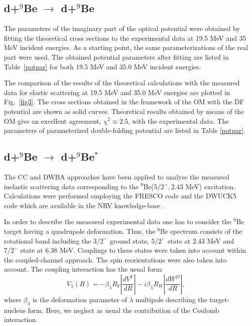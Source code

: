 \documentclass[
12pt, %
oneside, %
english, %
onehalfspacing, %
headsepline, %
]{MastersDoctoralThesis} %
\begin{document}
\subsection{d+$^9$Be $\rightarrow$ d+$^9$Be}
The parameters of the imaginary part of the optical potential were obtained by fitting the theoretical cross sections to the experimental data at 19.5 MeV and 35 MeV incident energies. As a starting point, the same parameterizations of the real part were used. The obtained potential parameters after fitting are listed in Table~\ref{potpar} for both 19.5 MeV and 35.0 MeV incident energies.

The comparison of the results of the theoretical calculations with  the measured data for elastic scattering at 19.5 MeV and 35.0 MeV energies are plotted in Fig.~\ref{fig3}. 
The cross sections obtained in the framework of the OM with the DF potential are shown as solid curves. 
Theoretical results obtained by means of the OM give an excellent agreement, $\chi^2\approx2.5$, with the experimental data. The  parameters of  parameterized double-folding potential are listed in Table \ref{potpar}. 

\subsection{d+$^9$Be $\rightarrow$ d+$^9$Be$^*$}

The CC and DWBA approaches have been applied to analyse the measured inelastic scattering data corresponding to the ${}^9$Be($5/2^-, 2.43$ MeV) excitation. Calculations were performed employing the FRESCO code \cite{fresco} and the DWUCK5 code \cite{kunz} which are available in the NRV knowledge-base \cite{nrv}.

In order to describe the measured experimental data one has to consider the ${}^9$Be target having a quadrupole deformation. Thus, the ${}^9$Be spectrum consists of the rotational band including the  $3/2^-$ ground state, $5/2^-$ state at 2.43 MeV and $7/2^-$ state at 6.38 MeV. Couplings to these states were taken into account within the coupled-channel approach. The spin reorientations were also taken into account. The coupling interaction has the usual form:
\begin{equation}
V_\lambda(R)=-\beta_\lambda R_V \left|\frac{d V^V}{dR}\right| - i \beta_\lambda R_W \left|\frac{d W^D}{dR}\right|,
\end{equation}
where $\beta_\lambda$ is the deformation parameter of $\lambda$ multipole describing the target-nucleus form. Here, we neglect as usual the contribution of the Coulomb interaction.
\end{document}
